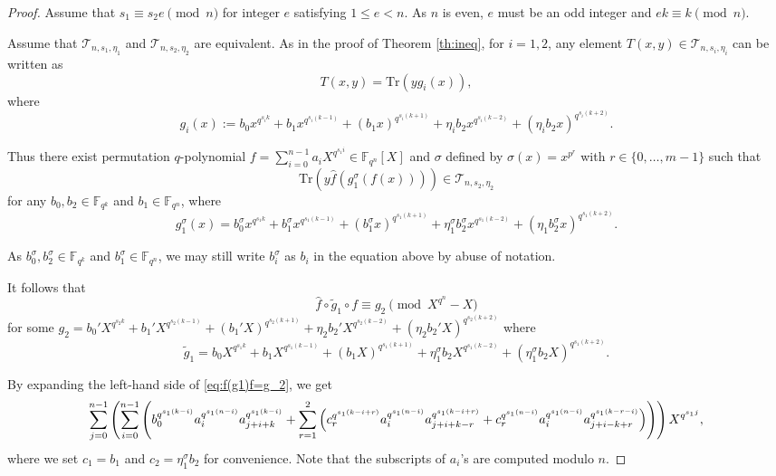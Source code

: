 \documentclass{amsart}
\theoremstyle{plain}
\theoremstyle{definition}
\newcommand{\F}{\mathbb F}
\newcommand{\fqn}{\mathbb{F}_{q^n}}
\newcommand{\Tr}{ \ensuremath{ \mathrm{Tr}}}
\newcommand{\cT}{\mathcal{T}}
\begin{document}
	\begin{proof}
		Assume that $s_1\equiv s_2 e\pmod{n}$ for integer $e$ satisfying $1\leq e<n$. As $n$ is even, $e$ must be an odd integer and $ek\equiv k \pmod{n}$.
		
		Assume that $\cT_{n,s_1, \eta_1}$ and $\cT_{n,s_2, \eta_2}$ are equivalent. 	As in the proof of Theorem \ref{th:ineq}, for $i=1,2$, any element $T(x,y) \in \cT_{n,s_i,\eta_i}$ can be written as
		$$T(x,y)=\Tr(yg_i(x)),$$
		where 
		\[g_i(x):=b_0x^{q^{s_i k}}+b_1x^{q^{s_i (k-1)}}+(b_1x)^{q^{s_i (k+1)}}+\eta_i b_2x^{q^{s_i (k-2)}}+(\eta_i  b_2x)^{q^{s_i (k+2)}}.\]
		
		Thus there exist permutation $q$-polynomial $f=\sum_{i=0}^{n-1}a_iX^{q^{s_1i}}\in\fqn[X]$ and $\sigma$ defined by $\sigma(x)=x^{p^r}$ with $r\in \{0,\dots,m-1\}$ such that	
		\[
		\Tr\left(y\hat{f}\left(g_1^{\sigma} (f(x))\right)\right)\in \cT_{n,s_2, \eta_2}
		\]
		for any $b_0,b_2\in \F_{q^k}$ and $b_1\in \F_{q^n}$, where 
		\[
		g_1^{\sigma}(x)=b_0^\sigma x^{q^{s_1 k}}+b_1^\sigma x^{q^{s_1 (k-1)}}+(b_1^\sigma x)^{q^{s_1 (k+1)}}+\eta_1^\sigma b_2^\sigma x^{q^{s_1 (k-2)}}+(\eta_1  b_2^\sigma x)^{q^{s_1 (k+2)}}.
		\]
		
		As $b_0^\sigma, b_2^\sigma\in \F_{q^k}$ and $b_1^\sigma\in \F_{q^n}$, we may still write $b_i^\sigma$ as $b_i$ in the equation above by abuse of notation.
		
		It follows that 
		\begin{equation}\label{eq:f(g1)f=g_2}
			\hat{f}\circ \tilde{g}_1 \circ f \equiv  g_2 \pmod{X^{q^n}-X}
		\end{equation}
		for some $g_2=b_0'X^{q^{s_2 k}}+b_1'X^{q^{s_2 (k-1)}}+(b_1'X)^{q^{s_2 (k+1)}}+\eta_2 b_2'X^{q^{s_2 (k-2)}}+(\eta_2  b_2'X)^{q^{s_2 (k+2)}}$ where
		\[\tilde{g}_1=b_0X^{q^{s_1k}}+b_1X^{q^{s_1(k-1)}}+(b_1X)^{q^{s_1(k+1)}}+\eta_1^\sigma b_2X^{q^{s_1(k-2)}}+(\eta_1^\sigma b_2X)^{q^{s_1(k+2)}}.\]
		
		By expanding the left-hand side of \eqref{eq:f(g1)f=g_2}, we get
		\begin{equation}\label{equi:0}
			\footnotesize
			\sum_{j = 0}^{n - 1} \left( \sum_{i = 0}^{n - 1} \left( b_0^{q^{s_1(k - i)}} a_i^{q^{s_1(n - i)}} a_{j + i+k}^{q^{s_1(k - i)}}  + \sum_{r = 1}^{2} \left( c_r^{q^{s_1(k - i +r)}} a_i^{q^{s_1(n - i)}} a_{j + i + k-r}^{q^{s_1(k - i+r)}} + c_r^{q^{s_1(n - i)}} a_i^{q^{s_1(n - i)}} a_{j + i - k+r}^{q^{s_1(k-r - i)}} \right) \right)\right) X^{q^{s_1j}},
		\end{equation}
		where we set $c_1=b_1$ and $c_2=\eta_1^\sigma b_2$ for convenience. Note that the subscripts of $a_i$'s are computed modulo $n$.
		

\end{proof}
\end{document}
